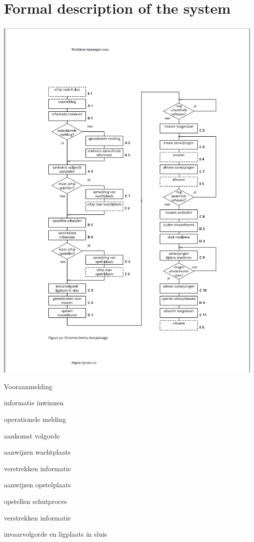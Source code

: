 {{{{{{{{{\begin{itemize}
\end{itemize}

\chapter{Formal description of the system}

\includegraphics[scale=0.65]{sluispassage.png}


\begin{itemize}
	\begin{minipage}{0.4\linewidth}
		\item Vooraanmelding
		\item informatie inwinnen
		\item operationele melding
		\item aankomst volgorde
		\item aanwijzen wachtplaats
		\item verstrekken informatie
		\item aanwijzen opstelplaats
		\item opstellen schutproces
		\item verstrekken informatie
		\item invaarvolgorde en ligplaats in sluis


\end{minipage}
\end{itemize}}}}}}}}}}
